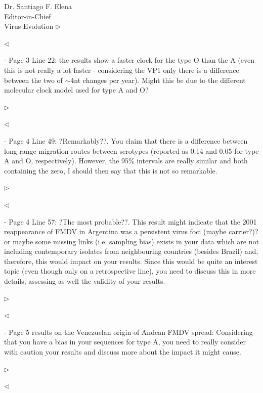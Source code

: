 \documentclass[ucla,biomath,12pt,noaddrfooter,datefrom]{UC_letter}
\newenvironment{reply}{$\triangleright$\bf}{$\triangleleft$}
\begin{document}
\begin{letter}{
Dr. Santiago F. Elena \\
Editor-in-Chief \\
Virus Evolution
}
\begin{reply}

\end{reply}

-       Page 3 Line 22: the results show a faster clock for the type O than the A (even this is not really a lot faster - considering the VP1 only there is a difference between the two of $\sim$4nt changes per year). 
Might this be due to the different molecular clock model used for type A and O?

\begin{reply}

\end{reply}

-       Page 4 Line 49: ?Remarkably??. 
You claim that there is a difference between long-range migration routes between serotypes (reported as 0.14 and 0.05 for type A and O, respectively). 
However, the 95\% intervals are really similar and both containing the zero, I should then say that this is not so remarkable.

\begin{reply}

\end{reply}

-       Page 4 Line 57: ?The most probable??. 
This result might indicate that the 2001 reappearance of FMDV in Argentina was a persistent virus foci (maybe carrier?)?or maybe some missing links (i.e. sampling bias) exists in your data which are not including contemporary isolates from neighbouring countries (besides Brazil) and, therefore, this would impact on your results. 
Since this would be quite an interest topic (even though only on a retrospective line), you need to discuss this in more details, assessing as well the validity of your results.

\begin{reply}

\end{reply}

-       Page 5 results on the Venezuelan origin of Andean FMDV spread: 
Considering that you have a bias in your sequences for type A, you need to really consider with caution your results and discuss more about the impact it might cause.

\begin{reply}

\end{reply}


\end{letter}
\end{document}
